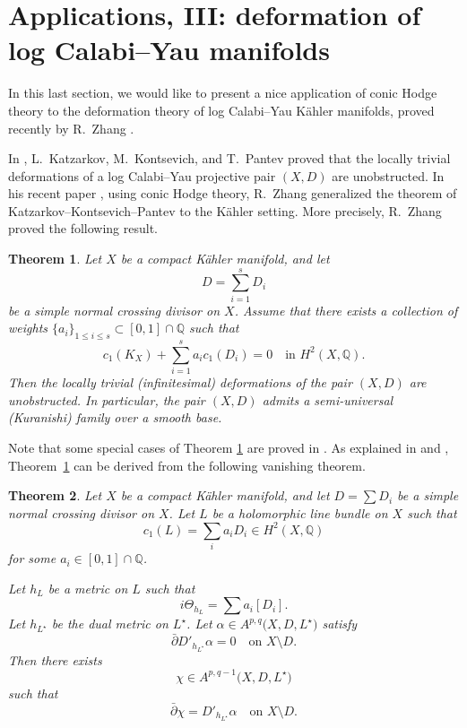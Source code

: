 \documentclass[english]{amsart}
\renewcommand{\le}{\leqslant}
\newcommand{\dbar}{\bar \partial}
\newtheorem{thm}{Theorem}[section]
\numberwithin{equation}{thm}
\begin{document}
	
	\section{Applications, III: deformation of log Calabi--Yau manifolds}\label{logCY}
	
	In this last section, we would like to present a nice application of conic Hodge theory to the deformation theory of log Calabi--Yau Kähler manifolds, proved recently by R.~Zhang \cite{Zhang}.
	
	In \cite{KKP}, L.~Katzarkov, M.~Kontsevich, and T.~Pantev proved that the locally trivial deformations of a log Calabi--Yau projective pair $(X,D)$ are unobstructed. In his recent paper \cite{Zhang}, using conic Hodge theory, R.~Zhang generalized the theorem of Katzarkov--Kontsevich--Pantev to the Kähler setting. More precisely, R.~Zhang proved the following result.
	
	\begin{thm}\cite[Thm A]{Zhang}\label{unobstr}
		Let $X$ be a compact Kähler manifold, and let
		\[
		D = \sum_{i=1}^s D_i
		\]
		be a simple normal crossing divisor on $X$. Assume that there exists a collection of
		weights $\{a_i\}_{1 \le i \le s} \subset [0,1] \cap \mathbb{Q}$ such that
		\begin{equation}\label{eq:logCY}
			c_1(K_X) + \sum_{i=1}^s a_i c_1(D_i) = 0 
			\quad \text{in } H^2(X,\mathbb{Q}).
		\end{equation}
		Then the locally trivial (infinitesimal) deformations of the pair $(X,D)$ are unobstructed. In particular, the pair $(X,D)$ admits a semi-universal (Kuranishi) family over a smooth base.
	\end{thm}
	
	Note that some special cases of Theorem \ref{unobstr} are proved in \cite{LRW, Wan18}. 
	As explained in \cite{Zhang} and \cite{Wan18}, Theorem~\ref{unobstr} can be derived from the following vanishing theorem.
	
	\begin{thm}\label{logddbar}\cite[Thm B]{Zhang}
		Let $X$ be a compact Kähler manifold, and let $D = \sum D_i$ be a simple normal crossing divisor on $X$. 
		Let $L$ be a holomorphic line bundle on $X$ such that
		\[
		c_1(L) = \sum_i a_i D_i \in H^2(X,\mathbb{Q})
		\]
		for some $a_i \in [0,1] \cap \mathbb{Q}$.
		
		Let $h_L$ be a metric on $L$ such that
		\[
		i\Theta_{h_L} = \sum a_i [D_i].
		\]
		Let $h_{L^\star}$ be the dual metric on $L^\star$.
		Let $\alpha \in A^{p,q}\bigl(X,D,L^\star\bigr)$ satisfy
		\[
		\dbar D'_{h_{L^\star}} \alpha = 0
		\quad \text{on } X \setminus D.
		\]
		Then there exists
		\[
		\chi \in A^{p,q-1}\bigl(X,D,L^\star\bigr)
		\]
		such that
		\begin{equation}\label{eq:logpartial}
			\dbar \chi = D'_{h_{L^\star}} \alpha
			\quad \text{on } X \setminus D.
		\end{equation}
	\end{thm}
	
\end{document}
